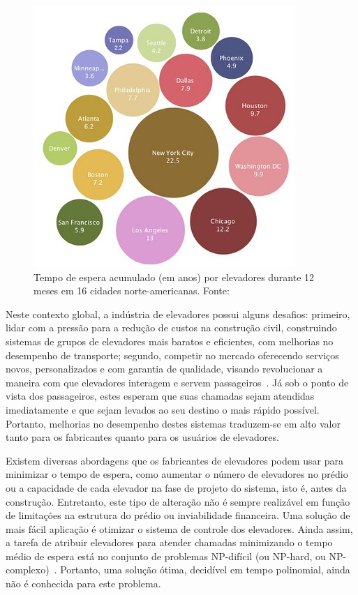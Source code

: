 \begin{figure}[htb!]
\centering\includegraphics{img/time-cost.jpg}
\caption{\label{fig:fig1}Tempo de espera acumulado (em anos) por elevadores durante 12 meses em 16 cidades norte-americanas. Fonte:~\cite{IBM10}}
\end{figure}

Neste contexto global, a indústria de elevadores possui alguns desafios: primeiro, lidar com a pressão para a redução de custos na construção civil, construindo sistemas de grupos de elevadores mais baratos e eficientes, com melhorias no desempenho de transporte; segundo, competir no mercado oferecendo serviços novos, personalizados e com garantia de qualidade, visando revolucionar a maneira com que elevadores interagem e servem passageiros~\cite{KOEHLEROTTIGER02}. Já sob o ponto de vista dos passageiros, estes esperam que suas chamadas sejam atendidas imediatamente e que sejam levados ao seu destino o mais rápido possível. Portanto, melhorias no desempenho destes sistemas traduzem-se em alto valor tanto para os fabricantes quanto para os usuários de elevadores.

Existem diversas abordagens que os fabricantes de elevadores podem usar para minimizar o tempo de espera, como aumentar o número de elevadores no prédio ou a capacidade de cada elevador na fase de projeto do sistema, isto é, antes da construção. Entretanto, este tipo de alteração não é sempre realizável em função de limitações na estrutura do prédio ou inviabilidade financeira. Uma solução de mais fácil aplicação é otimizar o sistema de controle dos elevadores. Ainda assim, a tarefa de atribuir elevadores para atender chamadas minimizando o tempo médio de espera está no conjunto de problemas NP-difícil (ou NP-hard, ou NP-complexo)~\cite{SeKo99}. Portanto, uma solução ótima, decidível em tempo polinomial, ainda não é conhecida para este problema.

